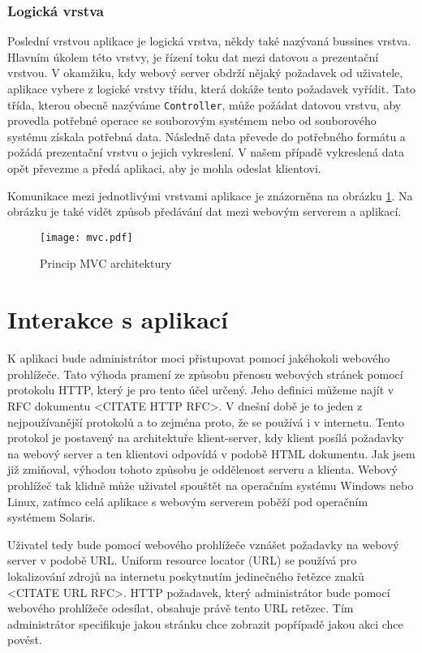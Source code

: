         \subsubsection{Logická vrstva}
        Poslední vrstvou aplikace je logická vrstva, někdy také nazývaná bussines vrstva. Hlavním úkolem této vrstvy, je řízení toku dat mezi datovou a prezentační vrstvou. V okamžiku, kdy webový server obdrží nějaký požadavek od uživatele, aplikace vybere z logické vrstvy třídu, která dokáže tento požadavek vyřídit. Tato třída, kterou obecně nazýváme \verb|Controller|, může požádat datovou vrstvu, aby provedla potřebné operace se souborovým systémem nebo od souborového systému získala potřebná data. Následně data převede do potřebného formátu a požádá prezentační vrstvu o jejich vykreslení. V našem případě vykreslená data opět převezme a předá aplikaci, aby je mohla odeslat klientovi.

        Komunikace mezi jednotlivými vrstvami aplikace je znázorněna na obrázku \ref{mvc}. Na obrázku je také vidět způsob předávání dat mezi webovým serverem a aplikací. 

    \begin{figure}[h]
        \caption{Princip MVC architektury}
        \label{mvc}
        \centering
        \texttt{[image: mvc.pdf]}
    \end{figure}
\section{Interakce s aplikací}
K aplikaci bude administrátor moci přistupovat pomocí jakéhokoli webového prohlížeče. Tato výhoda pramení ze způsobu přenosu webových stránek pomocí protokolu HTTP, který je pro tento účel určený. Jeho definici můžeme najít v RFC dokumentu <CITATE HTTP RFC>. V dnešní době je to jeden z nejpoužívanější protokolů a to zejména proto, že se používá i v internetu. Tento protokol je postavený na architektuře klient-server, kdy klient posílá požadavky na webový server a ten klientovi odpovídá v podobě HTML dokumentu. Jak jsem již zmiňoval, výhodou tohoto způsobu je oddělenost serveru a klienta. Webový prohlížeč tak klidně může uživatel spouštět na operačním systému Windows nebo Linux, zatímco celá aplikace s webovým serverem poběží pod operačním systémem Solaris.

Uživatel tedy bude pomocí webového prohlížeče vznášet požadavky na webový server v podobě URL. Uniform resource locator (URL) se používá pro lokalizování zdrojů na internetu poskytnutím jedinečného řetězce znaků <CITATE URL RFC>. HTTP požadavek, který administrátor bude pomocí webového prohlížeče odesílat, obsahuje právě tento URL retězec. Tím administrátor specifikuje jakou stránku chce zobrazit popřípadě jakou akci chce povést.

